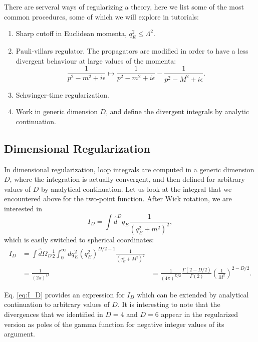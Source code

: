 \documentclass{article}
\numberwithin{equation}{section}
\begin{document}
There are serveral ways of regularizing a theory, here we list some of the most common procedures, some of which we will explore in tutorials:
\begin{enumerate}
    \item Sharp cutoff in Euclidean momenta, $q_E^2 \leq \Lambda^2$.
    \item Pauli-villars regulator. The propagators are modified in order to have a less divergent behaviour at large values of the momenta:
    \begin{equation}
        \frac{1}{p^2 - m^2 + i\epsilon} \mapsto \frac{1}{p^2 - m^2 + i\epsilon} - \frac{1}{p^2 - M^2 + i\epsilon}.
    \end{equation}
    \item Schwinger-time regularization.
    \item Work in generic dimension $D$, and define the divergent integrals by analytic continuation.
\end{enumerate}

\subsection{Dimensional Regularization}

In dimensional regularization, loop integrals are computed in a generic dimension $D$, where the integration is actually convergent, and then defined for arbitrary values of $D$ by analytical continuation. Let us look at the integral that we encountered above for the two-point function. After Wick rotation, we are interested in 
\begin{equation}
    I_D = \int \hat{d}^Dq_E \frac{1}{(q_E^2 + m^2)^2},
\end{equation}
which is easily switched to spherical coordinates:
\begin{equation} \label{eq:I_D}
\begin{aligned}
    I_D &= \int \hat{d}\Omega_D \frac{1}{2} \int_0^\infty dq_E^2 (q_E^2)^{D/2-1} \frac{1}{(q_E^2 + M^2)^2} \\
    &= \frac{1}{(2\pi)^D}
    &= \frac{1}{(4\pi)^{D/2}} \frac{\Gamma(2-D/2)}{\Gamma(2)} \left(\frac{1}{M^2}\right)^{2-D/2}.
\end{aligned}
\end{equation} %

Eq. \ref{eq:I_D} provides an expression for $I_D$ which can be extended by analytical continuation to arbitrary values of $D$. It is interesting to note that the divergences that we identified in $D=4$ and $D=6$ appear in the regularized version as poles of the gamma function for negative integer values of its argument. 
\end{document}
